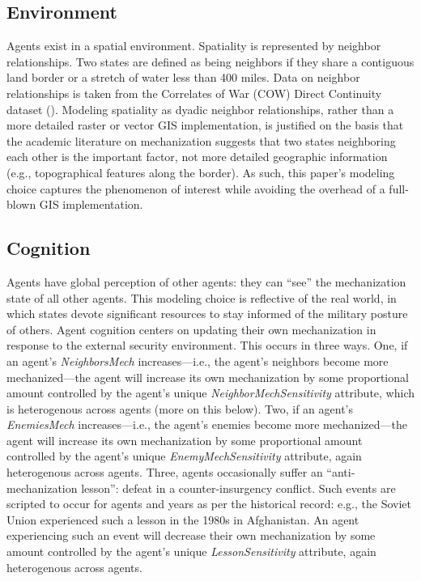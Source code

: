 \documentclass{article}
\begin{document}
\subsection{Environment}

Agents exist in a spatial environment. Spatiality is represented by neighbor
relationships. Two states are defined as
being neighbors if they share a contiguous land border or a stretch of water
less than 400 miles. Data on neighbor relationships is taken from the Correlates
of War (COW) Direct Continuity dataset (\cite{cow_contiguity}).
Modeling spatiality as dyadic neighbor relationships, rather than a more
detailed raster or vector GIS implementation, is justified on the basis that the
academic literature on mechanization suggests that two states neighboring each
other is the important factor, not more detailed geographic information (e.g.,
topographical features along the border). As such, this paper's modeling choice
captures the phenomenon of interest while avoiding the overhead of a full-blown GIS implementation.

\subsection{Cognition}

Agents have global perception of other agents: they can ``see'' the
mechanization state of all other agents. This modeling choice is reflective of
the real world, in which states devote significant resources to stay informed of
the military posture of others. Agent cognition centers on 
updating their own mechanization in response to the external security
environment. This occurs in three ways. One, if an agent's
\textit{NeighborsMech} increases---i.e., the agent's neighbors become more
mechanized---the agent will increase its own mechanization by some proportional
amount controlled by the agent's unique \textit{NeighborMechSensitivity}
attribute, which is heterogenous across agents (more on this below).
Two, if an agent's
\textit{EnemiesMech} increases---i.e., the agent's enemies become more
mechanized---the agent will increase its own mechanization by some proportional
amount controlled by the agent's unique \textit{EnemyMechSensitivity} attribute,
again heterogenous across agents. Three,
agents occasionally suffer an ``anti-mechanization lesson'': defeat in a
counter-insurgency conflict. Such events are scripted to occur for agents and
years as per the historical record: e.g., the Soviet Union experienced such a
lesson in the 1980s in Afghanistan. An agent experiencing such an event will
decrease their own mechanization by some amount controlled by the agent's
unique \textit{LessonSensitivity} attribute, again heterogenous across agents. 
\end{document}
